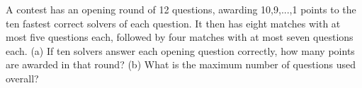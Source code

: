 A contest has an opening round of 12 questions, awarding 10,9,...,1 points to the ten fastest correct solvers of each question. It then has eight matches with at most five questions each, followed by four matches with at most seven questions each. (a) If ten solvers answer each opening question correctly, how many points are awarded in that round? (b) What is the maximum number of questions used overall?
